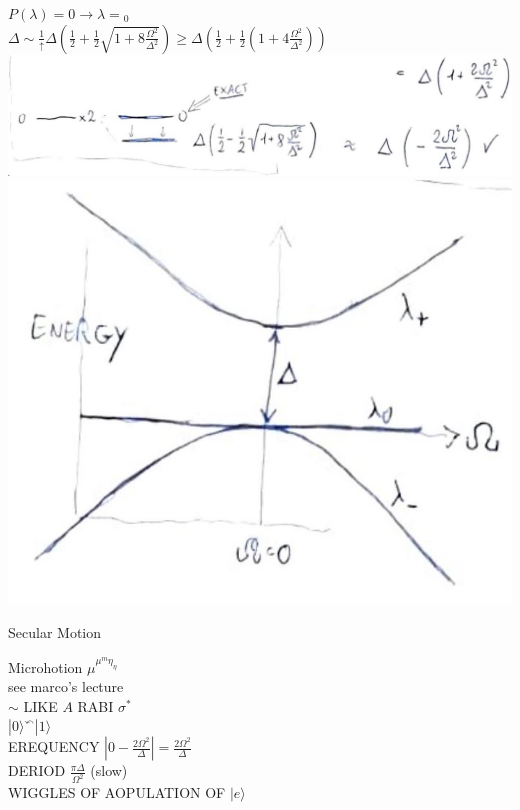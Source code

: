 \documentclass[10pt]{article}
\begin{document}
$P(\lambda)=0 \rightarrow \lambda={ }_{0}$\\
$\Delta \sim \frac{1}{\uparrow} \Delta\left(\frac{1}{2}+\frac{1}{2} \sqrt{1+8 \frac{\Omega^{2}}{\Delta^{2}}}\right) \geqslant \Delta\left(\frac{1}{2}+\frac{1}{2}\left(1+4 \frac{\Omega^{2}}{\Delta^{2}}\right)\right)$\\
\includegraphics[max width=\textwidth, center]{2025_10_16_f6b2ddb567eefef2c7a2g-5(1)}\\
\includegraphics[max width=\textwidth, center]{2025_10_16_f6b2ddb567eefef2c7a2g-5}

Secular Motion

Microhotion $\mu^{\mu^{m} \eta_{\eta}}$\\
see marco's lecture\\
$\sim$ LIKE $A$ RABI $\sigma^{*}$\\
$|0\rangle{ }^{\curvearrowleft}|1\rangle$\\
EREQUENCY $\left|0-\frac{2 \Omega^{2}}{\Delta}\right|=\frac{2 \Omega^{2}}{\Delta}$\\
DERIOD $\frac{\pi \Delta}{\Omega^{2}}$ (slow)\\
WIGGLES OF AOPULATION OF $|e\rangle$
\end{document}
